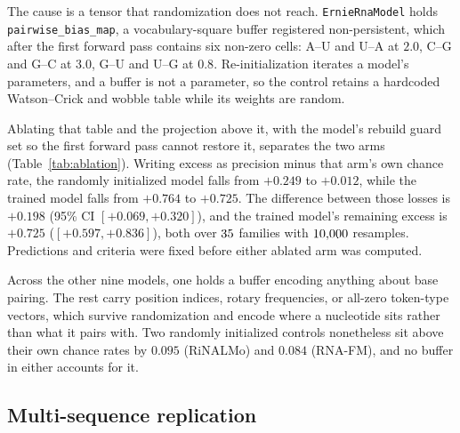 \documentclass[11pt]{article}
\begin{document}
The cause is a tensor that randomization does not reach.
\texttt{ErnieRnaModel} holds \texttt{pairwise\_bias\_map}, a
vocabulary-square buffer registered non-persistent, which after the first
forward pass contains six non-zero cells: A--U and U--A at $2.0$, C--G and G--C
at $3.0$, G--U and U--G at $0.8$. Re-initialization iterates a model's
parameters, and a buffer is not a parameter, so the control retains a hardcoded
Watson--Crick and wobble table while its weights are random.



Ablating that table and the projection above it, with the model's rebuild guard
set so the first forward pass cannot restore it, separates the two arms
(Table~\ref{tab:ablation}). Writing excess as precision minus that arm's own
chance rate, the randomly initialized model falls from $+0.249$ to $+0.012$,
while the trained model falls from $+0.764$ to $+0.725$. The difference between
those losses is $+0.198$ (95\% CI $[+0.069, +0.320]$), and the trained model's
remaining excess is $+0.725$ ($[+0.597, +0.836]$), both over
$35{}$ families with $10{,}000{}$ resamples. Predictions and
criteria were fixed before either ablated arm was computed.

Across the other nine models, one holds a buffer encoding anything about
base pairing. The rest carry position indices, rotary frequencies, or all-zero
token-type vectors, which survive randomization and encode where a nucleotide
sits rather than what it pairs with. Two randomly initialized controls
nonetheless sit above their own chance rates by $0.095$ (RiNALMo) and $0.084$
(RNA-FM), and no buffer in either accounts for it.

\subsection{Multi-sequence replication}
\label{sec:multiseq-results}
\end{document}
